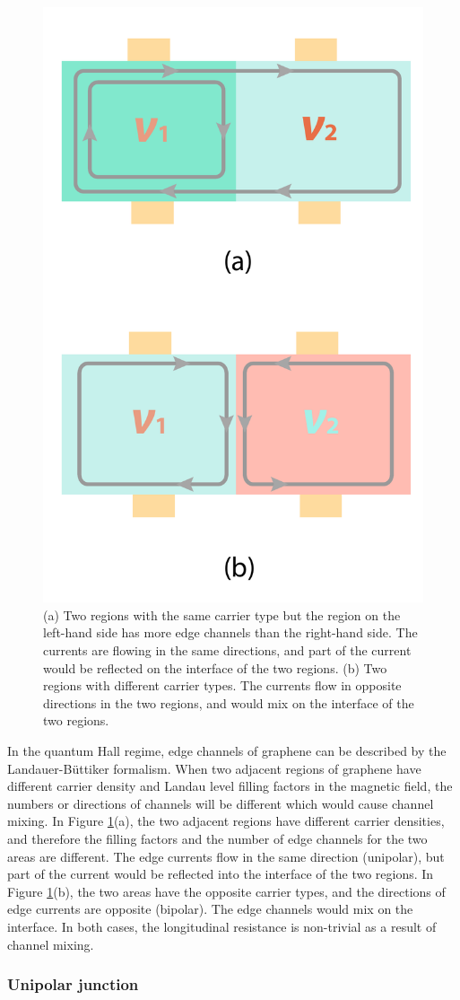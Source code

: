 \documentclass[pdflatex, sectionletters, 12pt]{pittetd}    %
\begin{document}
\begin{figure}[h!]
	\centering
	\includegraphics[width=.4\textwidth]{Drawing/Mixing.pdf}
	\caption{(a) Two regions with the same carrier type but the region on the left-hand side has more edge channels than the right-hand side. The currents are flowing in the same directions, and part of the current would be reflected on the interface of the two regions. (b) Two regions with different carrier types. The currents flow in opposite directions in the two regions, and would mix on the interface of the two regions.}
	\label{FIG:Mixing}
\end{figure}

In the quantum Hall regime, edge channels of graphene can be described by the Landauer-B{\"u}ttiker formalism. When two adjacent regions of graphene have different carrier density and Landau level filling factors in the magnetic field, the numbers or directions of channels will be different which would cause channel mixing. In Figure \ref{FIG:Mixing}(a), the two adjacent regions have different carrier densities, and therefore the filling factors and the number of edge channels for the two areas are different. The edge currents flow in the same direction (unipolar), but part of the current would be reflected into the interface of the two regions. In Figure \ref{FIG:Mixing}(b), the two areas have the opposite carrier types, and the directions of edge currents are opposite (bipolar). The edge channels would mix on the interface. In both cases, the longitudinal resistance is non-trivial as a result of channel mixing.

\subsubsection{Unipolar junction}
\end{document}
